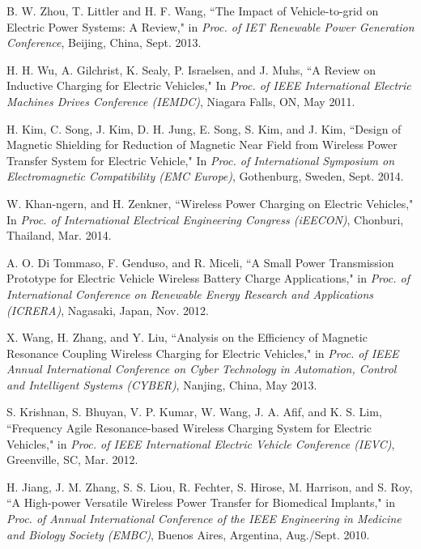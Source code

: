 \documentclass[twocolumn,10pt]{IEEEtran}
\begin{document}
\begin{thebibliography}{99}
B. W. Zhou, T. Littler and H. F. Wang, ``The Impact of Vehicle-to-grid on Electric Power Systems: A Review," in \emph{Proc. of IET Renewable Power Generation Conference}, Beijing, China, Sept. 2013.

 H. H. Wu, A. Gilchrist, K. Sealy, P. Israelsen, and J. Muhs, ``A Review on Inductive Charging for Electric Vehicles,"  In \emph{Proc. of IEEE  International Electric Machines  Drives Conference (IEMDC)}, Niagara Falls, ON, May 2011.


 H. Kim, C. Song, J. Kim, D. H. Jung, E. Song, S. Kim, and J. Kim, ``Design of Magnetic Shielding for Reduction of Magnetic Near Field from Wireless Power Transfer System for Electric Vehicle," In \emph{Proc. of International Symposium on Electromagnetic Compatibility (EMC Europe)}, Gothenburg, Sweden, Sept. 2014. 
 

 W. Khan-ngern, and H. Zenkner, ``Wireless Power Charging on Electric Vehicles,"  In \emph{Proc. of  International  Electrical Engineering Congress (iEECON)}, Chonburi, Thailand,  Mar. 2014. 
 
  A. O. Di Tommaso, F. Genduso, and R. Miceli, 
``A Small Power Transmission Prototype for Electric Vehicle Wireless Battery Charge Applications," in \emph{Proc. of  International Conference on Renewable Energy Research and Applications (ICRERA)}, Nagasaki, Japan, Nov. 2012.

 X. Wang, H. Zhang, and Y. Liu,
``Analysis on the Efficiency of Magnetic Resonance Coupling Wireless Charging for Electric Vehicles," in \emph{Proc. of  IEEE Annual International Conference on Cyber Technology in Automation, Control and Intelligent Systems (CYBER)}, Nanjing, China, May 2013.
 
  S. Krishnan, S. Bhuyan, V. P. Kumar, W. Wang, J. A. Afif, and K. S. Lim, ``Frequency Agile Resonance-based Wireless Charging System for Electric Vehicles," in \emph{Proc. of IEEE International Electric Vehicle Conference (IEVC)}, Greenville, SC, Mar. 2012.

  H. Jiang, J. M. Zhang, S. S. Liou, R. Fechter, S. Hirose,  M. Harrison, and S. Roy, ``A High-power Versatile Wireless Power Transfer for Biomedical Implants," in \emph{Proc. of Annual International Conference of the IEEE Engineering in Medicine and Biology Society (EMBC)}, Buenos Aires, Argentina, Aug./Sept. 2010. 


\end{thebibliography}
\end{document}
